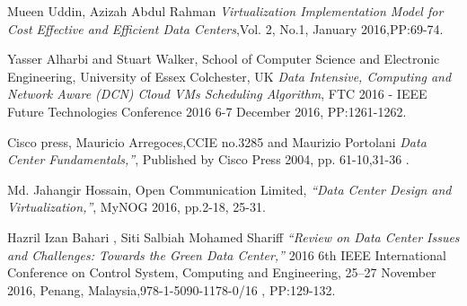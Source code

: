 \documentclass[12pt,a4paper]{report}
\begin{document}
\newpage

\begin{thebibliography}{li}
\label{chap:references}

Mueen Uddin, Azizah Abdul Rahman
{\em Virtualization Implementation Model for Cost Effective and Efficient Data Centers},Vol. 2, No.1, January 2016,PP:69-74.

Yasser Alharbi and Stuart Walker, School of Computer Science and Electronic Engineering, University of Essex Colchester, UK 
{\em  Data Intensive, Computing and Network Aware (DCN) Cloud VMs Scheduling Algorithm}, FTC 2016 - IEEE Future Technologies Conference 2016 6-7 December 2016, PP:1261-1262.

Cisco press, Mauricio Arregoces,CCIE no.3285 and Maurizio Portolani
{\em Data Center Fundamentals,”},
Published by Cisco Press 2004, pp. 61-10,31-36 .

Md. Jahangir Hossain, Open Communication Limited,
{\em “Data Center Design and Virtualization,”},
MyNOG 2016, pp.2-18, 25-31.

Hazril Izan Bahari , Siti Salbiah Mohamed Shariff
{\em “Review on Data Center Issues and Challenges: Towards the Green Data Center,”}
2016 6th IEEE International Conference on Control System, Computing and Engineering, 25–27 November 2016, Penang, Malaysia,978-1-5090-1178-0/16 , PP:129-132.

 
\end{thebibliography}


\end{document}
